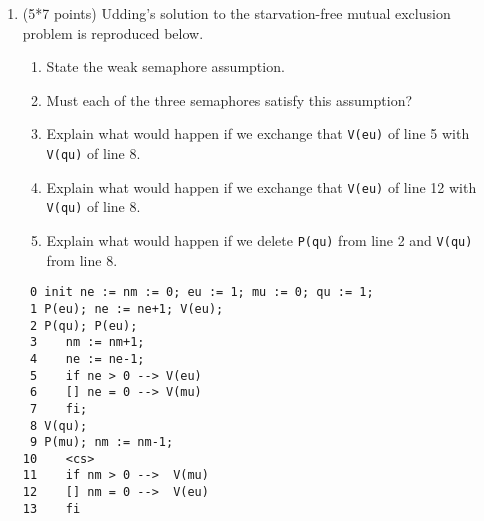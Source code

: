 \documentclass[12pt]{article}
\def\co{{\bf co}}
\def\oc{{\bf oc}}
\def\pa{{$\parallel$}}
\def\lb{$\langle$}
\def\rb{$\rangle$}
\def\ra{$\rightarrow$}
\def\await{{\bf await}}
\def\zand{\wedge}\def\zor{\vee}	\def\znot{\neg}
\begin{document}
\begin{enumerate}
\begin{enumerate}
\item
Explain the {\bf Concurrency Rule}, page 67, inference rule 2.11, of
Andrew's book reproduced below.\\

\begin{centering}
\{$P_i\} S_i \{Q_i\}$ are interference-free theorems, $1 \leq i \leq
n$\\[-8pt]
~.\hrulefill\\[-4pt]
$\{P_1 \zand \ldots \zand P_n\}$
\quad\co\quad $S_1 \parallel \ldots \parallel S_n$ \quad\oc\quad
$\{Q_1 \zand \ldots \zand Q_n\}$\par
\end{centering}

\item
Consider the following program segment:

\begin{tabbing}
\co\= \lb \await0\= $x \geq 3$ \=\ra0\= $x := x - 3$ \rb\kill
\co\> \lb \await \> $x \geq 3$ \>\ra \>$x := x - 3$ \rb\\
\pa\> \lb \await \> $x \geq 2$ \>\ra \>$x := x - 2$ \rb\\
\pa\> \lb \await \> $x = 1$ \>\ra \>$x := x + 5$ \rb\\
\oc
\end{tabbing}

Let $P$ be a predicate that characterizes the weakest deadloc-free
precondition for the program, i.e., the largest set of states such
that, if the program is begun in a state satisfying $P$, then it will
terminate if scheduling is weakly-fair.  Determine $P$.  Explain your
answer.
\end{enumerate}


\item (5*7 points)
Udding's solution to the starvation-free mutual exclusion problem is
reproduced below.
\begin{enumerate}
\item State the weak semaphore assumption.  
\item Must each of the three semaphores satisfy this assumption?  
\item Explain what would happen if we exchange that {\tt V(eu)} of line 5
with {\tt V(qu)} of line 8.  \item Explain what would happen if we
exchange that {\tt V(eu)} of line 12 with {\tt V(qu)} of line 8.
\item Explain what would happen if we delete {\tt P(qu)} from line 2 and
{\tt V(qu)} from line 8.
\end{enumerate}

\begin{verbatim}
 0 init ne := nm := 0; eu := 1; mu := 0; qu := 1;
 1 P(eu); ne := ne+1; V(eu);
 2 P(qu); P(eu);
 3    nm := nm+1;
 4    ne := ne-1;
 5    if ne > 0 --> V(eu)
 6    [] ne = 0 --> V(mu)
 7    fi;
 8 V(qu);
 9 P(mu); nm := nm-1;
10    <cs>
11    if nm > 0 -->  V(mu)
12    [] nm = 0 -->  V(eu)
13    fi
\end{verbatim}

\end{enumerate}
\end{document}
